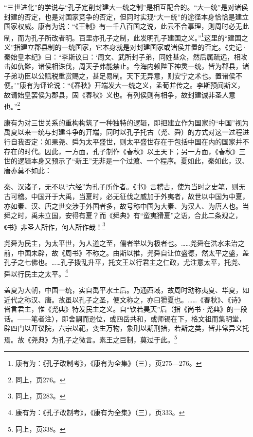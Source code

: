 \documentclass[a4paper, 12pt, openright]{ctexbook}
\renewenvironment{quote}
  {\list{}{\rightmargin2\ccwd \leftmargin2\ccwd \itemindent=2\ccwd \listparindent=2\ccwd}%
   \item\relax\small\kaishu\color{black}}
  {\endlist}
\begin{document}
“三世进化”的学说与“孔子定削封建大一统之制”是相互配合的。“大一统”是对诸侯封建的否定，也是对国家竞争的否定，但同时实现“大一统”的途径本身恰恰是建立国家权威。康有为说：“《王制》有一千八百国之说，此云不合事理，则周时必无此制，而为孔子所改者明。百里亦孔子之制，此发明孔子建国之义。”\footnote{康有为：《孔子改制考》，《康有为全集》（三），页275—276。}这里的“建国之义”指建立郡县制的一统国家，它本身就是对封建国家或诸侯并置的否定。《史记·秦始皇本纪》曰：“李斯议曰：‘周文、武所封子弟，同姓甚众，然后属疏远，相攻击如仇雠，诸侯相诛伐，周天子弗能禁止。今海内赖陛下神灵一统，皆为郡县，诸子弟功臣以公赋税重赏赐之，甚足易制。天下无异意，则安宁之术也。置诸侯不便。’”康有为评论说：“《春秋》开端发大一统之义，孟荀并传之。李斯预闻斯义，故请始皇罢侯为郡县，固《春秋》义也。有列侯则有相争，故封建诚非圣人意也。”\footnote{同上，页276。}

康有为对三世关系的重构构筑了一种独特的逻辑，即把建立作为国家的“中国”视为禹夏以来一统与封建斗争的开端，同时以孔子托古（尧、舜）的方式对这一过程进行自我否定：如果尧、舜为太平盛世，则太平盛世存在于包括中国在内的国家并不存在的时代。因此，一方面，孔子制作《春秋》以王天下；另一方面，《春秋》三世的逻辑本身又预示了“新王”无非是一个过渡、一个程序。夏如此，秦如此，汉、唐亦莫不如此：

\begin{quote}
秦、汉诸子，无不以“六经”为孔子所作者。《书》言稽古，使为当时之史笔，则无古可稽。中国开于大禹，当夏时，必无征伐之威加于外夷者，故世以中国为中夏，亦如秦、汉、唐之世交涉于外国者多，故号称中国为大秦、为汉人、为唐人也。当舜之时，禹未立国，安得有夏？而《舜典》有“蛮夷猾夏”之语，合此二条观之，《书》非圣人所作，何人所作哉！\footnote{同上，页283。}
\end{quote}

\begin{quote}
尧舜为民主，为太平世，为人道之至，儒者举以为极者也。……尧舜在洪水未治之前，中国未辟，故《周书》不称之。由斯以推，尧舜自让位盛德，然太平之盛，盖孔子之七佛也。……孔子拨乱升平，托文王以行君主之仁政，尤注意太平，托尧、舜以行民主之太平。\footnote{康有为：《孔子改制考》，《康有为全集》（三），页333。}
\end{quote}

\begin{quote}
盖夏为大朝，中国一统，实自禹平水土后。乃通西域，故周时动称夷夏、华夏，如近代之称汉、唐。故虽以孔子之圣，便文称之，亦曰猾夏也。……《春秋》、《诗》皆言君主，惟《尧典》特发民主之义。自“钦若昊天”后（指《尚书·尧典》的一段话。——笔者注），即舍嗣而逊位，或四岳共和，或师锡在下，格文祖而集明堂，辟四门以开议院，六宗以祀，变生万物，象刑以期刑措，若斯之类，皆非常异义托焉。故《尧典》为孔子之微言。素王之巨制，莫过于此。\footnote{同上，页338。}
\end{quote}
\end{document}
